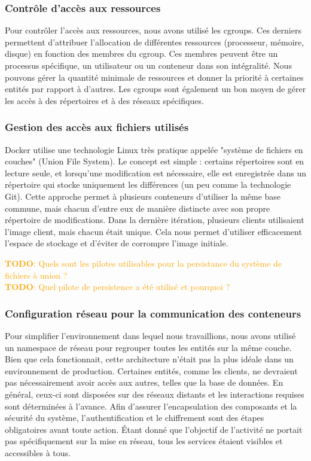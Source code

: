 \documentclass[a11paper, 11pt]{article}
\newcommand{\todo}[1]{\textcolor{orange}{\textbf{TODO}: #1}}
\begin{document}
\subsubsection{Contrôle d'accès aux ressources}

Pour contrôler l'accès aux ressources, nous avons utilisé les cgroups. Ces derniers permettent d'attribuer l'allocation de différentes ressources (processeur, mémoire, disque) en fonction des membres du cgroup. Ces membres peuvent être un processus spécifique, un utilisateur ou un conteneur dans son intégralité. Nous pouvons gérer la quantité minimale de ressources et donner la priorité à certaines entités par rapport à d'autres. Les cgroups sont également un bon moyen de gérer les accès à des répertoires et à des réseaux spécifiques.

\subsubsection{Gestion des accès aux fichiers utilisés}


Docker utilise une technologie Linux très pratique appelée "système de fichiers en couches" (Union File System). Le concept est simple : certains répertoires sont en lecture seule, et lorsqu'une modification est nécessaire, elle est enregistrée dans un répertoire qui stocke uniquement les différences (un peu comme la technologie Git). Cette approche permet à plusieurs conteneurs d'utiliser la même base commune, mais chacun d'entre eux de manière distincte avec son propre répertoire de modifications. Dans la dernière itération, plusieurs clients utilisaient l'image client, mais chacun était unique. Cela nous permet d'utiliser efficacement l'espace de stockage et d'éviter de corrompre l'image initiale.


\todo{Quels sont les pilotes utilisables pour la persistance du système de fichiers
à union ?} \\
\todo{Quel pilote de persistence a été utilisé et pourquoi ?}

\subsubsection{Configuration réseau pour la communication des conteneurs}

Pour simplifier l'environnement dans lequel nous travaillions, nous avons utilisé un namespace de réseau pour regrouper toutes les entités sur la même couche. Bien que cela fonctionnait, cette architecture n'était pas la plus idéale dans un environnement de production. Certaines entités, comme les clients, ne devraient pas nécessairement avoir accès aux autres, telles que la base de données. En général, ceux-ci sont disposées sur des réseaux distants et les interactions requises sont déterminées à l'avance. Afin d'assurer l'encapsulation des composants et la sécurité du système, l'authentification et le chiffrement sont des étapes obligatoires avant toute action. Étant donné que l'objectif de l'activité ne portait pas spécifiquement sur la mise en réseau, tous les services étaient visibles et accessibles à tous.
\end{document}
